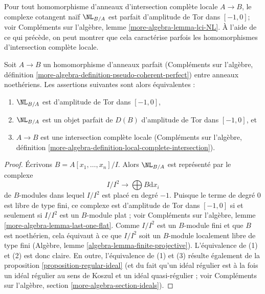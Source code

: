 \noindent
Pour tout homomorphisme d'anneaux d'intersection complète locale $A \to B$,
le complexe cotangent naïf $\NL_{B/A}$ est parfait
d'amplitude de Tor dans $[-1, 0]$; voir
Compléments sur l'algèbre, lemme \ref{more-algebra-lemma-lci-NL}. À
l'aide de ce qui précède, on peut montrer que cela
caractérise parfois les homomorphismes d'intersection complète locale.

\begin{lemma}
\label{lemma-perfect-NL-lci}
Soit $A \to B$ un homomorphisme d'anneaux parfait (Compléments sur l'algèbre, définition
\ref{more-algebra-definition-pseudo-coherent-perfect})
entre anneaux noethériens. Les assertions suivantes sont alors équivalentes :
\begin{enumerate}
\item $\NL_{B/A}$ est d'amplitude de Tor dans $[-1, 0]$,
\item $\NL_{B/A}$ est un objet parfait de $D(B)$
d'amplitude de Tor dans $[-1, 0]$, et
\item $A \to B$ est une intersection complète locale
(Compléments sur l'algèbre, définition
\ref{more-algebra-definition-local-complete-intersection}).
\end{enumerate}
\end{lemma}

\begin{proof}
Écrivons $B = A[x_1, \ldots, x_n]/I$. Alors $\NL_{B/A}$ est représenté par
le complexe
$$
I/I^2 \longrightarrow\bigoplus B \text{d}x_i
$$
de $B$-modules dans lequel $I/I^2$ est placé en degré $-1$. Puisque le terme
de degré $0$ est libre de type fini, ce complexe est d'amplitude de Tor dans $[-1, 0]$ si et
seulement si $I/I^2$ est un $B$-module plat ;
voir Compléments sur l'algèbre, lemme \ref{more-algebra-lemma-last-one-flat}.
Comme $I/I^2$ est un $B$-module fini et que $B$ est noethérien, cela
équivaut à ce que $I/I^2$ soit un $B$-module
localement libre de type fini (Algèbre, lemme \ref{algebra-lemma-finite-projective}).
L'équivalence de (1) et (2) est donc claire. En outre, l'équivalence
de (1) et (3) résulte également de la
proposition \ref{proposition-regular-ideal} (et
du fait qu'un idéal régulier est à la fois un idéal régulier au sens
de Koszul et un idéal quasi-régulier ; voir
Compléments sur l'algèbre, section \ref{more-algebra-section-ideals}).
\end{proof}


